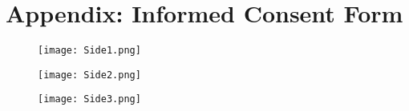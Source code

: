 \chapter{Appendix: Informed Consent Form}
\begin{figure}
\texttt{[image: Side1.png]}
\end{figure}

\begin{figure}
    \centering
    \texttt{[image: Side2.png]}
\end{figure}

\begin{figure}
    \centering
    \texttt{[image: Side3.png]}
\end{figure}

\label{consent}